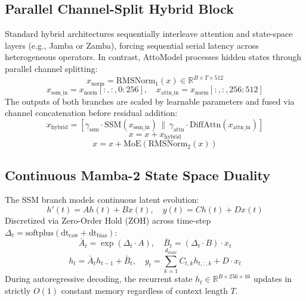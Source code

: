 \documentclass[10pt,twocolumn,letterpaper]{article}
\begin{document}
\subsection{Parallel Channel-Split Hybrid Block}
Standard hybrid architectures sequentially interleave attention and state-space layers (e.g., Jamba or Zamba), forcing sequential serial latency across heterogeneous operators. In contrast, AttoModel processes hidden states through parallel channel splitting:
\begin{equation}
    x_{\text{norm}} = \text{RMSNorm}_1(x) \in \mathbb{R}^{B \times T \times 512}
\end{equation}
\begin{equation}
    x_{\text{ssm\_in}} = x_{\text{norm}}[:, :, 0:256], \quad x_{\text{attn\_in}} = x_{\text{norm}}[:, :, 256:512]
\end{equation}
The outputs of both branches are scaled by learnable parameters and fused via channel concatenation before residual addition:
\begin{equation}
    x_{\text{hybrid}} = \left[ \gamma_{\text{ssm}} \cdot \text{SSM}(x_{\text{ssm\_in}}) \,\|\, \gamma_{\text{attn}} \cdot \text{DiffAttn}(x_{\text{attn\_in}}) \right]
\end{equation}
\begin{equation}
    x = x + x_{\text{hybrid}}
\end{equation}
\begin{equation}
    x = x + \text{MoE}(\text{RMSNorm}_2(x))
\end{equation}

\subsection{Continuous Mamba-2 State Space Duality}
The SSM branch models continuous latent evolution:
\begin{equation}
    h'(t) = A h(t) + B x(t), \quad y(t) = C h(t) + D x(t)
\end{equation}
Discretized via Zero-Order Hold (ZOH) across time-step $\Delta_t = \text{softplus}(\text{dt}_{\text{raw}} + \text{dt}_{\text{bias}})$:
\begin{equation}
    \bar{A}_t = \exp(\Delta_t \cdot A), \quad \bar{B}_t = (\Delta_t \cdot B) \cdot x_t
\end{equation}
\begin{equation}
    h_t = \bar{A}_t h_{t-1} + \bar{B}_t, \quad y_t = \sum_{k=1}^{d_{\text{state}}} C_{t, k} h_{t, :, k} + D \cdot x_t
\end{equation}
During autoregressive decoding, the recurrent state $h_t \in \mathbb{R}^{B \times 256 \times 16}$ updates in strictly $O(1)$ constant memory regardless of context length $T$.
\end{document}
